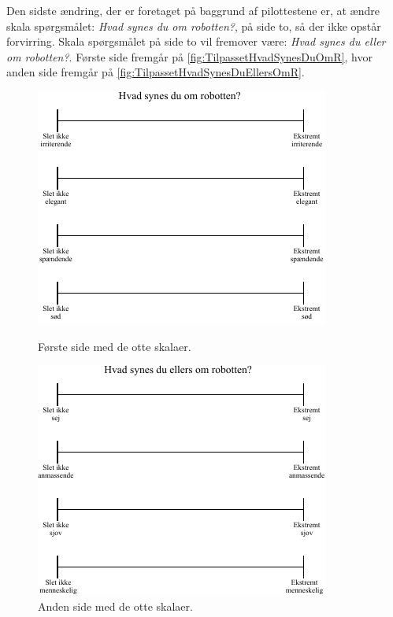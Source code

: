 \noindent
%
Den sidste ændring, der er foretaget på baggrund af pilottestene er, at ændre skala spørgsmålet: \textit{Hvad synes du om robotten?}, på side to, så der ikke opstår forvirring. Skala spørgsmålet på side to vil fremover være: \textit{Hvad synes du eller om robotten?}. Første side fremgår på \autoref{fig:TilpassetHvadSynesDuOmR}, hvor anden side fremgår på \autoref{fig:TilpassetHvadSynesDuEllersOmR}.  
%
\begin{figure}[H]
\centering
\begin{minipage}{.5\textwidth}
  \centering
  \includegraphics[width=\linewidth]{Figure/TestdesignEvaluering/TilpassetHvadSynesDuOmR}
  \caption{Første side med de otte skalaer.}
  \label{fig:TilpassetHvadSynesDuOmR}
\end{minipage}%
\begin{minipage}{.5\textwidth}
  \centering
  \includegraphics[width=\linewidth]{Figure/TestdesignEvaluering/HvadSynesDuEllersOmR}
  \caption{Anden side med de otte skalaer.}
  \label{fig:TilpassetHvadSynesDuEllersOmR}
\end{minipage}
\end{figure}
\noindent
%
